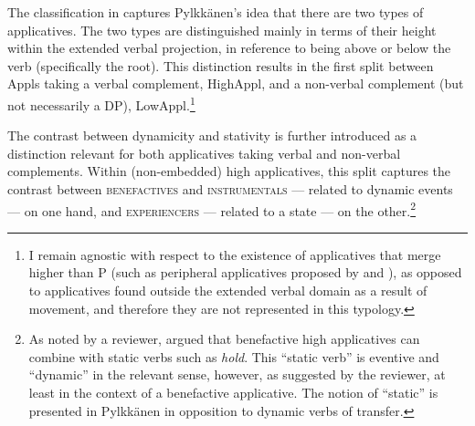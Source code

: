 \documentclass[output=paper,colorlinks,citecolor=brown,modfonts,nonflat]{langsci/langscibook}
\begin{document}
The classification in  captures Pylkkänen’s idea that there are two types of applicatives. The two types are distinguished mainly in terms of their height within the extended verbal projection, in reference to being above or below the verb (specifically the root). This distinction results in the first split between Appls taking a verbal complement, HighAppl, and a non-verbal complement (but not necessarily a DP), LowAppl.\footnote{I remain agnostic with respect to the existence of applicatives that merge higher than {\liv}P (such as peripheral applicatives proposed by \citealt{Kim2011high} and \citealt{Tsai2018}), as opposed to applicatives found outside the extended verbal domain as a result of movement, and therefore they are not represented in this typology.}


The contrast between dynamicity and stativity is further introduced as a distinction relevant for both applicatives taking verbal and non-verbal complements. Within (non-embedded) high applicatives, this split captures the contrast between \textsc{benefactives} and \textsc{instrumentals} — related to dynamic events — on one hand, and \textsc{experiencers} — related to a state — on the other.\footnote{As noted by a reviewer, \citet{Pylkkänen2008} argued that benefactive high applicatives can combine with static verbs such as \textit{hold}. This “static verb” is eventive and “dynamic” in the relevant sense, however, as suggested by the reviewer, at least in the context of a benefactive applicative. The notion of “static” is presented in Pylkkänen in opposition to dynamic verbs of transfer.}
\end{document}
